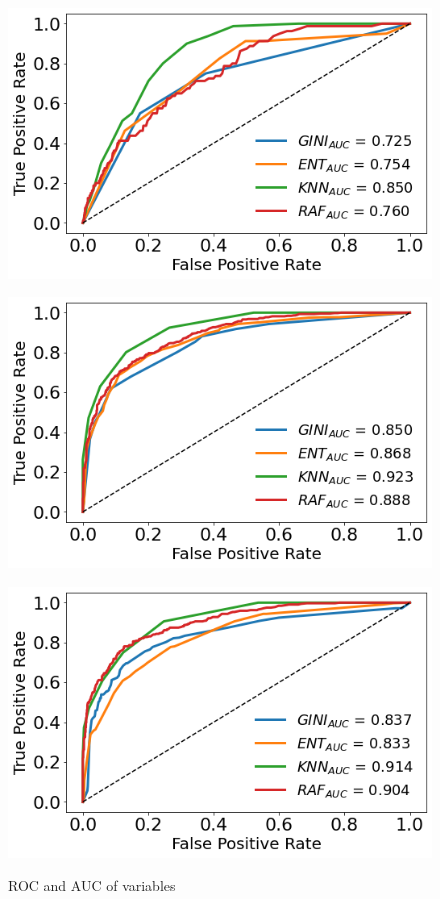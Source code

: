 \documentclass[a4paper,11pt,dvipsnames]{article}
\begin{document}
\begin{figure}[h]
\begin{minipage}[b]{.3\linewidth}
\centering\includegraphics[width=0.8\linewidth]{polysemy_ROC_c.png}\label{fig:polroc}
\end{minipage}    \hfil
\begin{minipage}[b]{.3\linewidth}
\centering\large \includegraphics[width=0.8\linewidth]{aoabinary_ROC_c.png}
\label{fig:aoabinroc}
\end{minipage}    \hfil
\begin{minipage}[b]{.3\linewidth}
\centering\includegraphics[width=0.8\linewidth]{perceivability_ROC_c.png}
\label{fig:perroc}
\end{minipage}


\caption{ROC and AUC of variables}\label{fig:roc}

\end{figure}
\end{document}
